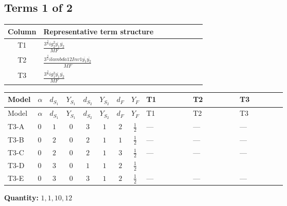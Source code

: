 \documentclass[8pt]{article}
\begin{document}
\begin{landscape}
\subsection*{Terms 1 of 2}
\begin{center}
\begin{tabular}{@{}c >{\raggedright\arraybackslash}p{0.82\linewidth}@{}}
\toprule
Column & Representative term structure \\
\midrule
T1 & \(\displaystyle \frac{3^{\frac{3}{4}} i g_{2}^{2} \overline{y_{1}} \overline{y_{2}}}{MF}\) \\
\midrule
T2 & \(\displaystyle \frac{3^{\frac{3}{4}} i lambda12Inv1 \overline{y_{1}} \overline{y_{2}}}{MF}\) \\
\midrule
T3 & \(\displaystyle \frac{3^{\frac{3}{4}} i g_{1}^{2} \overline{y_{1}} \overline{y_{2}}}{MF}\) \\
\midrule
\bottomrule
\end{tabular}
\end{center}
\smallskip
\tiny
\begin{longtable}{@{}llcccccc >{\raggedright\arraybackslash}p{0.21\linewidth} >{\raggedright\arraybackslash}p{0.21\linewidth} >{\raggedright\arraybackslash}p{0.21\linewidth}@{}}
\toprule
Model & $\alpha$ & $d_{S_1}$ & $Y_{S_1}$ & $d_{S_2}$ & $Y_{S_2}$ & $d_F$ & $Y_F$ & T1 & T2 & T3 \\
\midrule
\endfirsthead
\toprule
Model & $\alpha$ & $d_{S_1}$ & $Y_{S_1}$ & $d_{S_2}$ & $Y_{S_2}$ & $d_F$ & $Y_F$ & T1 & T2 & T3 \\
\midrule
\endhead
T3-A & $0$ & $1$ & $0$ & $3$ & $1$ & $2$ & $\frac{1}{2}$ & --- & --- & --- \\
\midrule
T3-B & $0$ & $2$ & $0$ & $2$ & $1$ & $1$ & $\frac{1}{2}$ & --- & --- & --- \\
\midrule
T3-C & $0$ & $2$ & $0$ & $2$ & $1$ & $3$ & $\frac{1}{2}$ & --- & --- & --- \\
\midrule
T3-D & $0$ & $3$ & $0$ & $1$ & $1$ & $2$ & $\frac{1}{2}$ & \scriptsize\adjustbox{max width=\linewidth}{$\begin{gathered} - \frac{11 \cdot 3^{\frac{3}{4}} i g_{2}^{2} \overline{y_{1}} \overline{y_{2}}}{8 MF}\end{gathered}$} & \scriptsize\adjustbox{max width=\linewidth}{$\begin{gathered} - \frac{3^{\frac{3}{4}} i lambda12Inv1 \overline{y_{1}} \overline{y_{2}}}{6 MF}\end{gathered}$} & \scriptsize\adjustbox{max width=\linewidth}{$\begin{gathered} - \frac{3^{\frac{3}{4}} i g_{1}^{2} \overline{y_{1}} \overline{y_{2}}}{8 MF}\end{gathered}$} \\
\midrule
T3-E & $0$ & $3$ & $0$ & $3$ & $1$ & $2$ & $\frac{1}{2}$ & --- & --- & --- \\
\midrule
\bottomrule
\end{longtable}
\clearpage
\noindent\textbf{Quantity: }$\mathrm{1,1,10,12}$\par\smallskip

\end{landscape}
\end{document}
